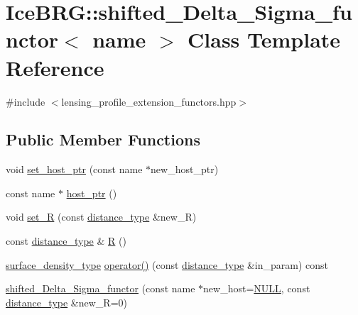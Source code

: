 \hypertarget{classIceBRG_1_1shifted__Delta__Sigma__functor}{\section{Ice\-B\-R\-G\-:\-:shifted\-\_\-\-Delta\-\_\-\-Sigma\-\_\-functor$<$ name $>$ Class Template Reference}
\label{classIceBRG_1_1shifted__Delta__Sigma__functor}
}


{\ttfamily \#include $<$lensing\-\_\-profile\-\_\-extension\-\_\-functors.\-hpp$>$}

\subsection*{Public Member Functions}
\begin{DoxyCompactItemize}
\item 
void \hyperlink{classIceBRG_1_1shifted__Delta__Sigma__functor_a2bd009ea31f1e18682211ed44870a1a9}{set\-\_\-host\-\_\-ptr} (const name $\ast$new\-\_\-host\-\_\-ptr)
\item 
const name $\ast$ \hyperlink{classIceBRG_1_1shifted__Delta__Sigma__functor_a324af3df928b93e23413866d4e099a3a}{host\-\_\-ptr} ()
\item 
void \hyperlink{classIceBRG_1_1shifted__Delta__Sigma__functor_a82c45f87daa763cc4f0095b6ad725c0f}{set\-\_\-\-R} (const \hyperlink{namespaceIceBRG_a45499647eb87e24c10ab32c628711cec}{distance\-\_\-type} \&new\-\_\-\-R)
\item 
const \hyperlink{namespaceIceBRG_a45499647eb87e24c10ab32c628711cec}{distance\-\_\-type} \& \hyperlink{classIceBRG_1_1shifted__Delta__Sigma__functor_a03ab67eec9e4f2ee4de6cf8b8214f9b0}{R} ()
\item 
\hyperlink{namespaceIceBRG_a80c597ef5ba0a32491d32a9f0083b02d}{surface\-\_\-density\-\_\-type} \hyperlink{classIceBRG_1_1shifted__Delta__Sigma__functor_aee4ca5d44f4649e03d80d229b9a2f05d}{operator()} (const \hyperlink{namespaceIceBRG_a45499647eb87e24c10ab32c628711cec}{distance\-\_\-type} \&in\-\_\-param) const 
\item 
\hyperlink{classIceBRG_1_1shifted__Delta__Sigma__functor_a01d15cd18fde3dafb9128aceb49da3ae}{shifted\-\_\-\-Delta\-\_\-\-Sigma\-\_\-functor} (const name $\ast$new\-\_\-host=\hyperlink{lib_2IceBRG__main_2common_8h_a070d2ce7b6bb7e5c05602aa8c308d0c4}{N\-U\-L\-L}, const \hyperlink{namespaceIceBRG_a45499647eb87e24c10ab32c628711cec}{distance\-\_\-type} \&new\-\_\-\-R=0)
\end{DoxyCompactItemize}


